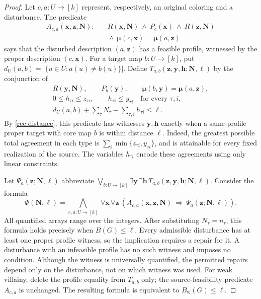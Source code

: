 \documentclass[11pt,reqno]{amsart}
\numberwithin{equation}{section}
\theoremstyle{definition}
\theoremstyle{remark}
\begin{document}
\begin{proof}
Let $c,a:U\to[k]$ represent, respectively, an original coloring and
a disturbance. The predicate
\[
\begin{aligned}
A_{c,a}(\mathbf x,\mathbf z,\mathbf N):\quad&
R(\mathbf x,\mathbf N)\ \wedge\ P_c(\mathbf x)\
\wedge\ R(\mathbf z,\mathbf N)\\
&{}\wedge\
\boldsymbol\mu(c,\mathbf x)=\boldsymbol\mu(a,\mathbf z)
\end{aligned}
\]
says that the disturbed description $(a,\mathbf z)$ has a feasible
profile, witnessed by the proper description $(c,\mathbf x)$.
For a target map $b:U\to[k]$, put
$d_U(a,b)=|\{u\in U:a(u)\ne b(u)\}|$. Define
$T_{a,b}(\mathbf z,\mathbf y,\mathbf h;\mathbf N,\ell)$ by the
conjunction of
\[
\begin{gathered}
R(\mathbf y,\mathbf N),\qquad P_b(\mathbf y),\qquad
\boldsymbol\mu(b,\mathbf y)=\boldsymbol\mu(a,\mathbf z),\\
0\leq h_{\tau i}\leq z_{\tau i},\qquad
h_{\tau i}\leq y_{\tau i}\quad\text{for every }\tau,i,\\
d_U(a,b)+\sum_\tau N_\tau-\sum_{\tau,i}h_{\tau i}\leq\ell.
\end{gathered}
\]
By \cref{rec:distance}, this predicate has witnesses
$\mathbf y,\mathbf h$ exactly when a same-profile proper target
with core map $b$ is within distance $\ell$. Indeed, the greatest
possible total agreement in each type is
$\sum_i\min\{z_{\tau i},y_{\tau i}\}$, and is attainable for every
fixed realization of the source. The variables $h_{\tau i}$
encode these agreements using only linear constraints.

Let $\Psi_a(\mathbf z;\mathbf N,\ell)$ abbreviate
$\bigvee_{b:U\to[k]}\exists\mathbf y\,\exists\mathbf h\,
T_{a,b}(\mathbf z,\mathbf y,\mathbf h;\mathbf N,\ell)$.
Consider the formula
\begin{equation}\label{rec:presburger}
\Phi(\mathbf N,\ell)=
\bigwedge_{c,a:U\to[k]}\ \forall\mathbf x\,\forall\mathbf z\
\left(
A_{c,a}(\mathbf x,\mathbf z,\mathbf N)
\ \Longrightarrow\
\Psi_a(\mathbf z;\mathbf N,\ell)
\right).
\end{equation}
All quantified arrays range over the integers. After substituting
$N_\tau=n_\tau$, this formula holds precisely when $B(G)\leq\ell$.
Every admissible disturbance has at least one proper profile witness,
so the implication requires a repair for it. A disturbance with an
infeasible profile has no such witness and imposes no condition.
Although the witness is universally quantified, the permitted repairs
depend only on the disturbance, not on which witness was used.
For weak villainy, delete the profile equality from $T_{a,b}$ only;
the source-feasibility predicate $A_{c,a}$ is unchanged. The resulting
formula is equivalent to $B_{\mathrm w}(G)\leq\ell$.


\end{proof}
\end{document}
